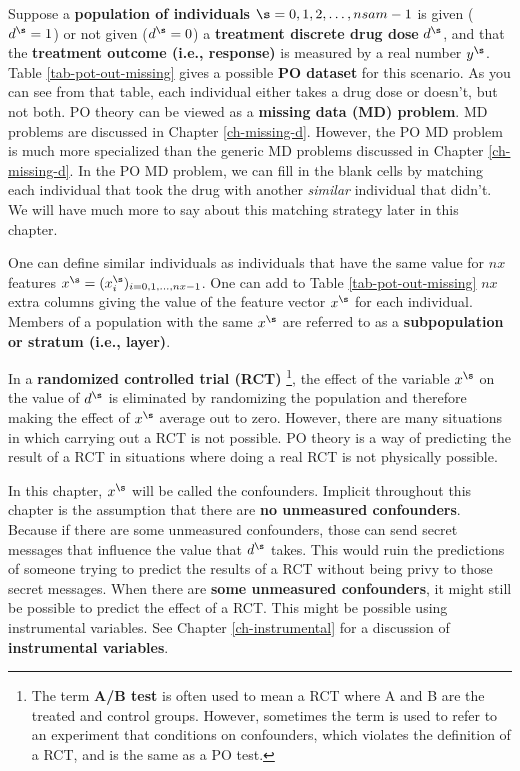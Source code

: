 Suppose a {\bf population
of individuals} $\s=0,1,2, \ldots, nsam-1$
is given ($d^\s=1$) or
not given ($d^\s=0$)
a {\bf treatment discrete drug dose} $d^\s$,
and that
the
 {\bf treatment outcome (i.e., response)}
is measured by
a real number $y^\s$.
Table \ref{tab-pot-out-missing}
gives a possible {\bf PO dataset}
for this scenario.
As you
can see from
that table,
each individual
either takes a drug
dose or
doesn't,
but not both.
PO theory
can be viewed as a
 {\bf  missing
data (MD) problem}. MD problems are
discussed in
 Chapter \ref{ch-missing-d}.
However, the PO MD problem
is much more specialized
than the generic MD problems
discussed in Chapter \ref{ch-missing-d}.
In the PO MD
problem, we can
fill
in the blank cells
by matching
each individual
that took
the drug with
another {\it similar}
individual that didn't.
We will have much
more to say about
this matching
strategy later in this chapter.

One can define
similar
individuals as
individuals that have the same
value
for $nx$ features $x^\s=(x^\s_i)_{i=0, 1, \ldots, nx-1}$.
One
can add to Table \ref{tab-pot-out-missing}
 $nx$ extra columns
giving the value of
the feature vector $x^\s$
for each individual.
Members
of a population with
the same $x^\s$
are referred to as
a
{\bf subpopulation or stratum (i.e., layer)}.

In a {\bf randomized controlled trial (RCT)}
\footnote{The term {\bf A/B test}
is often used to mean a RCT
where A and B are the treated and control groups. However,
sometimes the term is used to refer to
an experiment  that conditions on confounders,
which violates the definition of a RCT,
and is the same as a PO test.},
the effect
of the variable $x^\s$ on
the value
of $d^\s$
is eliminated by
randomizing
the population
and therefore
making the effect of $x^\s$
average out  to zero.
However,
there are many situations
in which carrying out a RCT is not
possible. PO theory is
a way of predicting the
result
of a RCT in situations where
doing a real RCT is not physically possible.

In this chapter, $x^\s$
will be called the confounders.
Implicit throughout this chapter
is the assumption that there are {\bf
no unmeasured confounders}.
Because if
there are some unmeasured confounders,
those can
send secret messages
that influence the value
that $d^\s$ takes.
This would ruin
the
predictions
of someone trying
to predict the results of a RCT
without
being privy to those secret
messages.
When there are {\bf some
unmeasured confounders},
it might still be
possible
to
predict the effect of a RCT.
This might be possible
using instrumental variables. See Chapter
\ref{ch-instrumental}
for a discussion
of {\bf instrumental
variables}.


